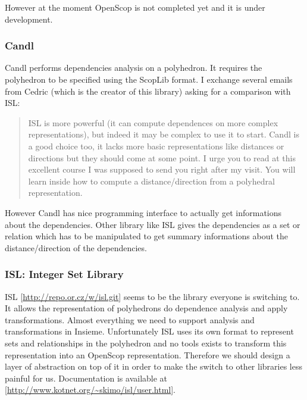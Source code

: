 However at the moment OpenScop is not completed yet and it is under development. 

\subsubsection{Candl}
Candl performs dependencies analysis on a polyhedron. It requires the polyhedron
to be specified using the ScopLib format. I exchange several emails from Cedric
(which is the creator of this library) asking for a comparison with ISL:

\begin{quotation}
ISL is more powerful (it can compute dependences on more complex
representations), but indeed it may be complex to use it to start.
Candl is a good choice too, it lacks more basic representations like distances
or directions but they should come at some point.  I urge you to read at this
excellent course I was supposed to send you right after my visit. You will learn
inside how to compute a distance/direction from a polyhedral representation. 
\end{quotation}

However Candl has nice programming interface to actually get informations about
the dependencies. Other library like ISL gives the dependencies as a set or
relation which has to be manipulated to get summary informations about the
distance/direction of the dependencies. 

\subsubsection{ISL: Integer Set Library}
ISL [\url{http://repo.or.cz/w/isl.git}] seems to be the library everyone is
switching to. It allows the representation of polyhedrons do dependence analysis
and apply transformations.  Almost everything we need to support analysis and
transformations in Insieme.  Unfortunately ISL uses its own format to represent
sets and relationships in the polyhedron and no tools exists to transform this
representation into an OpenScop representation. Therefore we should design a
layer of abstraction on top of it in order to make the switch to other libraries
less painful for us. Documentation is available at
[\url{http://www.kotnet.org/~skimo/isl/user.html}]. 

